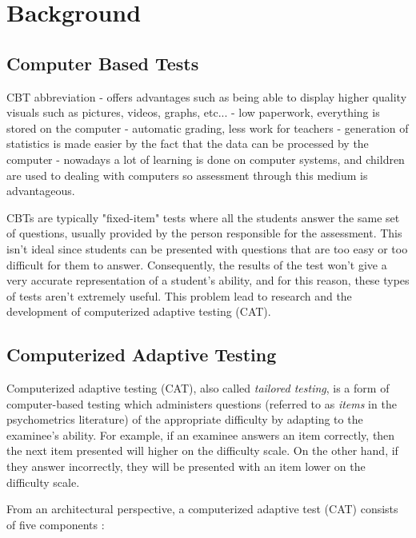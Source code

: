 \chapter{Background}

\section{Computer Based Tests}
CBT abbreviation
- offers advantages such as being able to display higher quality visuals such as pictures, videos, graphs, etc...
- low paperwork, everything is stored on the computer
- automatic grading, less work for teachers
- generation of statistics is made easier by the fact that the data can be processed by the computer
- nowadays a lot of learning is done on computer systems, and children are used to dealing with computers so assessment through this medium is advantageous. \newline

CBTs are typically "fixed-item" tests where all the students answer the same set of questions,  usually provided by the person responsible for the assessment. This isn't ideal since students can be presented with questions that are too easy or too difficult for them to answer. Consequently, the results of the test won't give a very accurate representation of a student's ability, and for this reason, these types of tests aren't extremely useful. This problem lead to research and the development of computerized adaptive testing (CAT).

\section{Computerized Adaptive Testing}
Computerized adaptive testing (CAT), also called \textit{tailored testing}, is a form of computer-based testing which administers questions (referred to as \textit{items} in the psychometrics literature) of the appropriate difficulty by adapting to the examinee's ability.
For example, if an examinee answers an item correctly, then the next item presented will higher on the difficulty scale. On the other hand, if they answer incorrectly, they will be presented with an item lower on the difficulty scale. \newline

From an architectural perspective, a computerized adaptive test (CAT) consists of five components \cite{CAT-Framework}:

